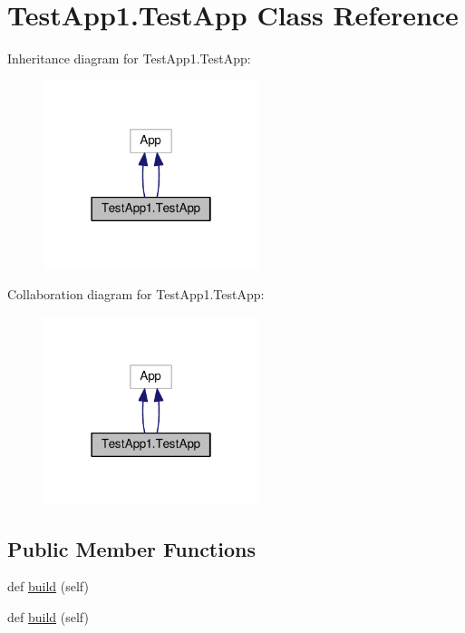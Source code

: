 \hypertarget{classTestApp1_1_1TestApp}{}\section{Test\+App1.\+Test\+App Class Reference}
\label{classTestApp1_1_1TestApp}


Inheritance diagram for Test\+App1.\+Test\+App\+:\nopagebreak
\begin{figure}[H]
\begin{center}
\leavevmode
\includegraphics[width=178pt]{classTestApp1_1_1TestApp__inherit__graph}
\end{center}
\end{figure}


Collaboration diagram for Test\+App1.\+Test\+App\+:\nopagebreak
\begin{figure}[H]
\begin{center}
\leavevmode
\includegraphics[width=178pt]{classTestApp1_1_1TestApp__coll__graph}
\end{center}
\end{figure}
\subsection*{Public Member Functions}
\begin{DoxyCompactItemize}
\item 
def \hyperlink{classTestApp1_1_1TestApp_a3f9852f574a1b9273b95c63de9dbfc64}{build} (self)
\item 
def \hyperlink{classTestApp1_1_1TestApp_a3f9852f574a1b9273b95c63de9dbfc64}{build} (self)
\end{DoxyCompactItemize}
